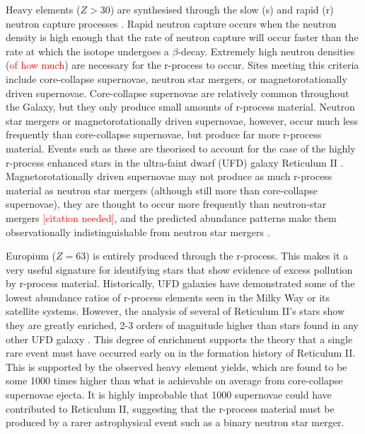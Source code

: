 \documentclass[a4paper,fleqn,usenatbib]{mnras}
\newcommand{\todo}[1]{\textcolor{red}{#1}}
\begin{document}
	Heavy elements ($Z > 30$) are synthesised through the slow (s) and rapid (r) neutron capture processes \citep[e.g.,][]{Burbidge1957,Sneden2008}. 
	Rapid neutron capture occurs when the neutron density is high enough that the rate of neutron capture will occur faster than the rate at which the isotope undergoes a $\beta$-decay. Extremely high neutron densities (\todo{of how much}) are necessary for the r-process to occur. Sites meeting this criteria include core-collapse supernovae, neutron star mergers, or magnetorotationally driven supernovae. Core-collapse supernovae are relatively common throughout the Galaxy, but they only produce small amounts of r-process material. Neutron star mergers or magnetorotationally driven supernovae, however, occur much less frequently than core-collapse supernovae, but produce far more r-process material. Events such as these are theorised to account for the case of the highly r-process enhanced stars in the ultra-faint dwarf (UFD) galaxy Reticulum II \citep{Ji2016}. %
Magnetorotationally driven supernovae may not produce as much r-process material as neutron star mergers (although still more than core-collapse supernovae), they are thought to occur more frequently than neutron-star mergers \todo{[citation needed]}, and the predicted abundance patterns make them observationally indistinguishable from neutron star mergers \citep{Ji2016}.
	
	Europium ($Z=63$) is entirely produced through the r-process. This makes it a very useful signature for identifying stars that show evidence of excess pollution by r-process material. %
	Historically, UFD galaxies have demonstrated some of the lowest abundance ratios of r-process elements seen in the Milky Way or its satellite systems. However, the analysis of several of Reticulum II's stars show they are greatly enriched, 2-3 orders of magnitude higher than stars found in any other UFD galaxy \citep{Ji2016}. This degree of enrichment supports the theory that a single rare event must have occurred early on in the formation history of Reticulum II. This is supported by the observed heavy element yields, which are found to be some 1000 times higher than what is achievable on average from core-collapse supernovae ejecta. It is highly improbable that 1000 supernovae could have contributed to Reticulum II, suggesting that the r-process material must be produced by a rarer astrophysical event such as a binary neutron star merger.
	
\end{document}
